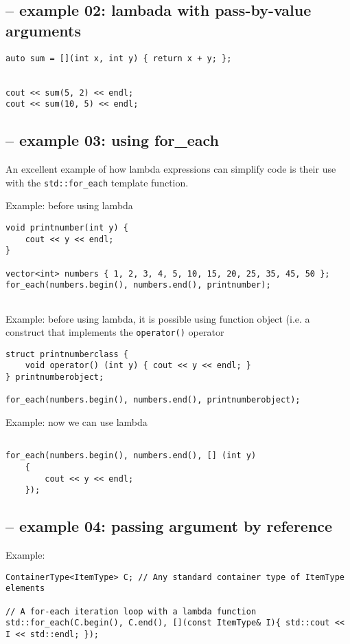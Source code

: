 \subsection{-- example 02: lambada with pass-by-value arguments}

\begin{lstlisting}
auto sum = [](int x, int y) { return x + y; };


cout << sum(5, 2) << endl;
cout << sum(10, 5) << endl;
\end{lstlisting}

\subsection{-- example 03: using for\_each}

An excellent example of how lambda expressions can simplify code is their use with the 
\verb!std::for_each! template function.


Example: before using lambda
\begin{lstlisting}
void printnumber(int y) {
    cout << y << endl;
}

vector<int> numbers { 1, 2, 3, 4, 5, 10, 15, 20, 25, 35, 45, 50 };
for_each(numbers.begin(), numbers.end(), printnumber);
    
\end{lstlisting}

Example: before using lambda, it is possible using function object (i.e. a construct that implements the \verb!operator()! operator
\begin{verbatim}
struct printnumberclass {
    void operator() (int y) { cout << y << endl; }
} printnumberobject;
 
for_each(numbers.begin(), numbers.end(), printnumberobject);
\end{verbatim}

Example: now we can use lambda
\begin{verbatim}

for_each(numbers.begin(), numbers.end(), [] (int y)
    {
        cout << y << endl;
    });
\end{verbatim}

\subsection{-- example 04: passing argument by reference}

Example:
\begin{lstlisting}
ContainerType<ItemType> C; // Any standard container type of ItemType elements
 
// A for-each iteration loop with a lambda function
std::for_each(C.begin(), C.end(), [](const ItemType& I){ std::cout << I << std::endl; });
\end{lstlisting}

